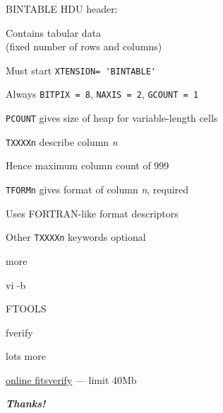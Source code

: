 \documentclass[20pt,landscape]{foils}
\newif\ifrubric
\newcommand{\bhref}[2]{\href{#1}{{\color{blue}#2}}}
\begin{document}
\begin{list0}
  \item BINTABLE HDU header:
  \begin{list2big}
    \item Contains tabular data \\
          (fixed number of rows and columns)
    \item Must start {\color{brown}\verb*|XTENSION= 'BINTABLE'|}
    \item Always {\color{brown}\tt BITPIX = 8},
                 {\color{brown}\tt NAXIS = 2},
                 {\color{brown}\tt GCOUNT = 1}
    \item {\color{brown}\tt PCOUNT} gives size of heap for variable-length cells
    \item {\color{brown}\tt TXXXXn} describe column {\sl n}
    \begin{list3}
      \item Hence maximum column count of 999
    \end{list3}
    \item {\color{brown}\tt TFORMn} gives format of column {\sl n},
          required
    \begin{list3}
      \item Uses FORTRAN-like format descriptors
    \end{list3}
    \item Other {\color{brown}\tt TXXXXn} keywords optional
  \end{list2big}
\end{list0}




\begin{list2}
  \item more
  \item vi -b
  \item FTOOLS
  \begin{list3}
    \item fverify
    \item lots more
  \end{list3}
  \item \bhref{https://fits.gsfc.nasa.gov/fits_verify.html}{online fitsverify}
        --- limit 40Mb
\end{list2}


\vspace{0.2cm}
\begin{center}
  {\color{darkred}\Huge\bf\sl Thanks!}
\end{center}

\label{lastPage}

\ifrubric

\newcommand{\aobSlide}[1]{
\newpage
\rightfooter{}
\MyLogo{}
\begin{picture}(30,0)
  #1
\end{picture}
\bigword{AOB?}
}
\aobSlide{}

\fi
\end{document}
